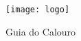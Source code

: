 \thispagestyle{empty}

{\centering\texttt{[image: logo]}} %
      
{\Huge\centering Guia do Calouro}


